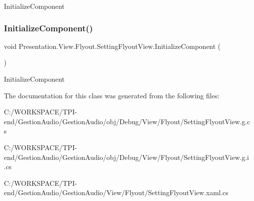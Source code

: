 Initialize\+Component 

\mbox{\label{class_presentation_1_1_view_1_1_flyout_1_1_setting_flyout_view_abbcaa47b8f30638a2b4254afeb72dd33}} 
\subsubsection{\texorpdfstring{Initialize\+Component()}{InitializeComponent()}\hspace{0.1cm}{\footnotesize\ttfamily [4/4]}}
{\footnotesize\ttfamily void Presentation.\+View.\+Flyout.\+Setting\+Flyout\+View.\+Initialize\+Component (\begin{DoxyParamCaption}{ }\end{DoxyParamCaption})}



Initialize\+Component 



The documentation for this class was generated from the following files\+:\begin{DoxyCompactItemize}
\item 
C\+:/\+W\+O\+R\+K\+S\+P\+A\+C\+E/\+T\+P\+I-\/end/\+Gestion\+Audio/\+Gestion\+Audio/obj/\+Debug/\+View/\+Flyout/Setting\+Flyout\+View.\+g.\+cs\item 
C\+:/\+W\+O\+R\+K\+S\+P\+A\+C\+E/\+T\+P\+I-\/end/\+Gestion\+Audio/\+Gestion\+Audio/obj/\+Debug/\+View/\+Flyout/Setting\+Flyout\+View.\+g.\+i.\+cs\item 
C\+:/\+W\+O\+R\+K\+S\+P\+A\+C\+E/\+T\+P\+I-\/end/\+Gestion\+Audio/\+Gestion\+Audio/\+View/\+Flyout/Setting\+Flyout\+View.\+xaml.\+cs\end{DoxyCompactItemize}
